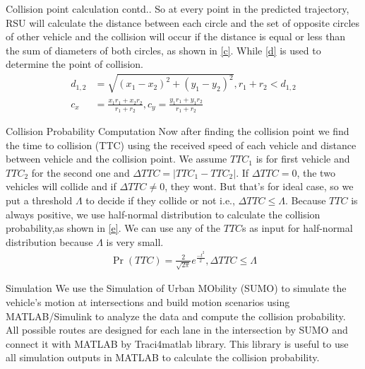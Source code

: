 \documentclass{beamer}
\providecommand{\pr}[1]{\ensuremath{\Pr\left(#1\right)}}
\begin{document}
\begin{frame}{Collision point calculation contd..}
    So at every point in the predicted trajectory, RSU will calculate the distance between each circle and the set of opposite circles of other vehicle and the  collision will occur if the distance is equal or less than the sum of diameters of both circles,  as shown in \eqref{c}. While \eqref{d} is used to determine the point of collision.
    \begin{align}
        d_{1,2}&=\sqrt{(x_1-x_2)^2+(y_1-y_2)^2}, r_1+r_2<d_{1,2}
        \label{c}\\
        c_x&=\frac{x_1r_1+x_2r_2}{r_1+r_2},c_y=\frac{y_1r_1+y_1r_2}{r_1+r_2}
        \label{d}
    \end{align}
\end{frame}
\begin{frame}{Collision Probability Computation}
    Now after finding the collision point we find the time to collision (TTC) using the received speed of each vehicle and distance between vehicle and the collision point. We assume $TTC_1$ is for first vehicle and $TTC_2$ for the second one and $\Delta TTC=\lvert TTC_1-TTC_2\rvert$. If $\Delta TTC=0$, the two vehicles will collide and if $\Delta TTC\neq0$, they wont. But that's for ideal case, so we put a threshold $\Lambda$ to decide if they collide or not i.e., $\Delta TTC\leq\Lambda$. Because $TTC$ is always positive, we use half-normal distribution to calculate the collision probability,as shown in \eqref{e}. We can use any of the $TTC$s as input for half-normal distribution because $\Lambda$ is very small. 
    \begin{align}
        \pr{TTC}=\frac{2}{\sqrt{2\pi}}e^{\frac{-t^2}{2}},\Delta TTC\leq\Lambda
        \label{e}
    \end{align}
\end{frame}
\begin{frame}{Simulation}
    We  use  the  Simulation of Urban MObility  (SUMO) to simulate the vehicle’s motion at intersections and build motion scenarios using MATLAB/Simulink to analyze the data and compute the collision probability. All possible routes are designed for each lane in the intersection by SUMO and connect it with MATLAB by Traci4matlab library. This library is useful to use all simulation outputs in MATLAB to calculate the collision probability.
\end{frame}
\end{document}
